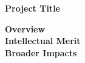 \begin{center}
    {\bf Project Title  \xx}
\end{center}

{\bf \noindent Overview}\\

\vspace{0.5em} 
{\bf \noindent Intellectual Merit}\\

\vspace{0.5em} 
{\bf \noindent Broader Impacts}\\